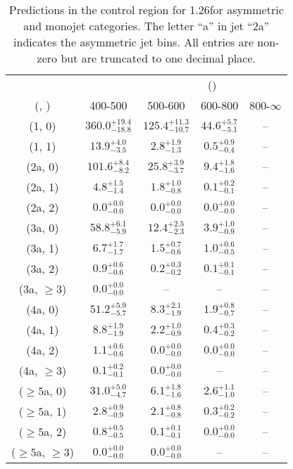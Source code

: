 \begin{table}[h!]
\tiny
\centering
\caption{Predictions in the \gj control region for 1.26\ifb for asymmetric and monojet categories. The letter ``a'' in jet \eg ``2a''  indicates the asymmetric jet bins. All entries are non-zero but are truncated to one decimal place.\label{tab:predsep_ewk_gj_asym}}
\begin{tabular}
{ccccc}
	\hline\hline
&	& \multicolumn{4}{c}{\scalht (\gev)} \\ 
	 (\njet,  \nb) & 400-500 & 500-600 & 600-800 & 800-$\infty$ \\ [0.8ex] 
\hline
	(1, 0) & $360.0^{+ 19.4 }_{- 18.8 }$ & $125.4^{+ 11.3 }_{- 10.7 }$ & $44.6^{+ 5.7 }_{- 5.1 }$ & -- \\[0.5ex] 
	(1, 1) & $13.9^{+ 4.0 }_{- 3.5 }$ & $2.8^{+ 1.9 }_{- 1.3 }$ & $0.5^{+ 0.9 }_{- 0.4 }$ & -- \\[0.5ex] 
	(2a, 0) & $101.6^{+ 8.4 }_{- 8.2 }$ & $25.8^{+ 3.9 }_{- 3.7 }$ & $9.4^{+ 1.8 }_{- 1.6 }$ & -- \\[0.5ex] 
	(2a, 1) & $4.8^{+ 1.5 }_{- 1.4 }$ & $1.8^{+ 1.0 }_{- 0.8 }$ & $0.1^{+ 0.2 }_{- 0.1 }$ & -- \\[0.5ex] 
	(2a, 2) & $0.0^{+ 0.0 }_{- 0.0 }$ & $0.0^{+ 0.0 }_{- 0.0 }$ & $0.0^{+ 0.0 }_{- 0.0 }$ & -- \\[0.5ex] 
	(3a, 0) & $58.8^{+ 6.1 }_{- 5.9 }$ & $12.4^{+ 2.5 }_{- 2.3 }$ & $3.9^{+ 1.0 }_{- 0.9 }$ & -- \\[0.5ex] 
	(3a, 1) & $6.7^{+ 1.7 }_{- 1.7 }$ & $1.5^{+ 0.7 }_{- 0.6 }$ & $1.0^{+ 0.6 }_{- 0.5 }$ & -- \\[0.5ex] 
	(3a, 2) & $0.9^{+ 0.6 }_{- 0.6 }$ & $0.2^{+ 0.3 }_{- 0.2 }$ & $0.1^{+ 0.1 }_{- 0.1 }$ & -- \\[0.5ex] 
	(3a, $\ge3$) & $0.0^{+ 0.0 }_{- 0.0 }$ & -- & -- & -- \\[0.5ex] 
	(4a, 0) & $51.2^{+ 5.9 }_{- 5.7 }$ & $8.3^{+ 2.1 }_{- 1.9 }$ & $1.9^{+ 0.8 }_{- 0.7 }$ & -- \\[0.5ex] 
	(4a, 1) & $8.8^{+ 1.9 }_{- 1.9 }$ & $2.2^{+ 1.0 }_{- 0.9 }$ & $0.4^{+ 0.3 }_{- 0.2 }$ & -- \\[0.5ex] 
	(4a, 2) & $1.1^{+ 0.6 }_{- 0.6 }$ & $0.0^{+ 0.0 }_{- 0.0 }$ & $0.0^{+ 0.0 }_{- 0.0 }$ & -- \\[0.5ex] 
	(4a, $\ge3$) & $0.1^{+ 0.2 }_{- 0.1 }$ & $0.0^{+ 0.0 }_{- 0.0 }$ & -- & -- \\[0.5ex] 
	($\ge5$a, 0) & $31.0^{+ 5.0 }_{- 4.7 }$ & $6.1^{+ 1.8 }_{- 1.6 }$ & $2.6^{+ 1.1 }_{- 1.0 }$ & -- \\[0.5ex] 
	($\ge5$a, 1) & $2.8^{+ 0.9 }_{- 0.9 }$ & $2.1^{+ 0.8 }_{- 0.8 }$ & $0.3^{+ 0.2 }_{- 0.2 }$ & -- \\[0.5ex] 
	($\ge5$a, 2) & $0.8^{+ 0.5 }_{- 0.5 }$ & $0.1^{+ 0.1 }_{- 0.1 }$ & $0.0^{+ 0.0 }_{- 0.0 }$ & -- \\[0.5ex] 
	($\ge5$a, $\ge3$) & $0.0^{+ 0.0 }_{- 0.0 }$ & $0.0^{+ 0.0 }_{- 0.0 }$ & -- & -- \\[0.5ex] 
	\hline
	\hline
\end{tabular}
\end{table}
